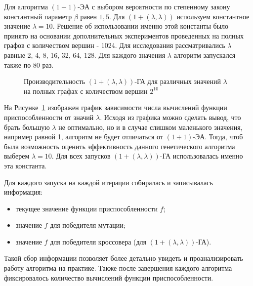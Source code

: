 \documentclass[times]{itmo-student-thesis}
\newcommand{\alglambda}{${(1 + (\lambda , \lambda))}$\xspace}
\newcommand{\alglambdaf}{${(1 + (\lambda , \lambda))}$-ГА\xspace}
\newcommand{\oea}{\mbox{$(1 + 1)$-ЭА}\xspace}
\newcommand{\ollga}{${(1 + (\lambda , \lambda))}$-ГА\xspace}
\begin{document}
Для алгоритма \oea с выбором вероятности по степенному закону константный параметр $\beta$ равен $1,5$. Для \alglambda используем константное значение $\lambda = 10$.
Решение об использовании именно этой константы было принято на основании дополнительных экспериментов проведенных на полных графов с количеством вершин - 1024. Для исследования рассматривались $\lambda$ равные 2, 4, 8, 16, 32, 64, 128. Для каждого значения $\lambda$ алгоритм запускался также по 80 раз.

\begin{figure}[t!]
\caption{Производительность \ollga для различных значений $\lambda$ на полных графах с количеством вершин $2^{10}$}
\label{fig:lambda}
\end{figure}

На Рисунке~\ref{fig:lambda} изображен график зависимости числа вычислений функции приспособленности от значий $\lambda$. Исходя из графика можно сделать вывод, что брать большую $\lambda$ не оптимально, но и в случае слишком маленького значения, например равной 1, алгоритм не будет отличаться от \oea. Тогда, чтоб была возможность оценить эффективность данного генетического алгоритма выберем $\lambda = 10$. Для всех запусков \alglambdaf использовалась именно эта константа.

Для каждого запуска на каждой итерации собиралась и записывалась  информация:
\begin{itemize}
 \item текущее значение функции приспособленности $f$;
 \item значение $f$ для победителя мутации;
 \item значение $f$ для победителя кроссовера (для \alglambdaf).
\end{itemize}
Такой сбор информации позволяет более детально увидеть и проанализировать работу алгоритма на практике.
Также после завершения каждого алгоритма фиксировалось количество вычислений функции приспособленности.
\end{document}

